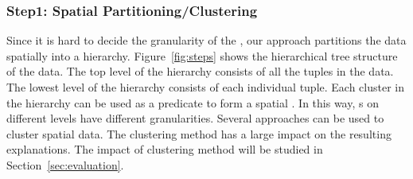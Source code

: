 \subsubsection{Step1: Spatial Partitioning/Clustering}
Since it is hard to decide the granularity of the {\explanation}, our approach partitions the data spatially into a hierarchy. 
Figure~\ref{fig:steps} shows the hierarchical tree structure of the data. 
The top level of the hierarchy consists of all the tuples in the data. 
The lowest level of the hierarchy consists of each individual tuple. 
Each cluster in the hierarchy can be used as a predicate to form a spatial {\explanation}. 
In this way, {\explanation}s on different levels have different granularities. 
Several approaches can be used to cluster spatial data. The clustering method has a large impact on the resulting explanations. The impact of clustering method will be studied in Section~\ref{sec:evaluation}.






